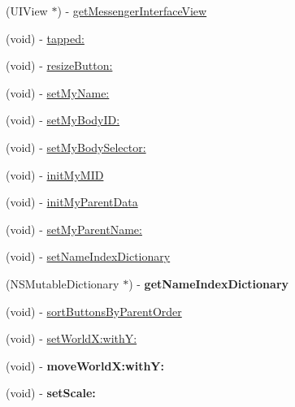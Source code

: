 \begin{DoxyCompactItemize}
\item 
(UIView $\ast$) -\/ \hyperlink{interface_messenger_view_controller_ae7d3fbe4156df4e7f1539f50500f0919}{getMessengerInterfaceView}
\item 
(void) -\/ \hyperlink{interface_messenger_view_controller_a008c7cc6364c75b6f70ef3d79fa3a043}{tapped:}
\item 
(void) -\/ \hyperlink{interface_messenger_view_controller_a61c88e671203c5651b89394f3b300285}{resizeButton:}
\item 
(void) -\/ \hyperlink{interface_messenger_view_controller_afe36a73932b47fb2c60412c6f03f67ac}{setMyName:}
\item 
(void) -\/ \hyperlink{interface_messenger_view_controller_abab9347cc7ed46bd04978ca00e081a0e}{setMyBodyID:}
\item 
(void) -\/ \hyperlink{interface_messenger_view_controller_ade8005d21b7d8df69ddd12fba7440f6b}{setMyBodySelector:}
\item 
(void) -\/ \hyperlink{interface_messenger_view_controller_a2c2f7a46b94facbc66d66c7dd6da34bd}{initMyMID}
\item 
(void) -\/ \hyperlink{interface_messenger_view_controller_a5728b61e9c4490af7aacddd874026bae}{initMyParentData}
\item 
(void) -\/ \hyperlink{interface_messenger_view_controller_a9d6939385be720d5335fbf5b095cd63c}{setMyParentName:}
\item 
(void) -\/ \hyperlink{interface_messenger_view_controller_a791916fe5a33b084e90d14cd12d9bc30}{setNameIndexDictionary}
\item 
\hypertarget{interface_messenger_view_controller_a27a84207c430e3402014720823e7b7dd}{
(NSMutableDictionary $\ast$) -\/ {\bfseries getNameIndexDictionary}}
\label{d7/d34/interface_messenger_view_controller_a27a84207c430e3402014720823e7b7dd}

\item 
(void) -\/ \hyperlink{interface_messenger_view_controller_a6c8d083521df8a95e9e88612745d5981}{sortButtonsByParentOrder}
\item 
(void) -\/ \hyperlink{interface_messenger_view_controller_a3939f43ce30df6b8df0390712730282b}{setWorldX:withY:}
\item 
\hypertarget{interface_messenger_view_controller_a48556e3f4bded903ba3080d2411ce5ec}{
(void) -\/ {\bfseries moveWorldX:withY:}}
\label{d7/d34/interface_messenger_view_controller_a48556e3f4bded903ba3080d2411ce5ec}

\item 
\hypertarget{interface_messenger_view_controller_a4f8fb574a6997e9f92731c32a4155c77}{
(void) -\/ {\bfseries setScale:}}
\label{d7/d34/interface_messenger_view_controller_a4f8fb574a6997e9f92731c32a4155c77}


\end{DoxyCompactItemize}
